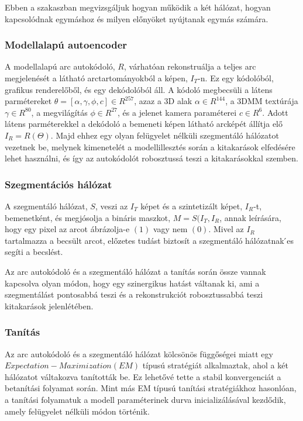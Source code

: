 \documentclass[12pt,a4]{article}
\begin{document}
 	Ebben a szakaszban megvizsgáljuk hogyan működik a két hálózat,
 	hogyan kapcsolódnak egymáshoz és milyen előnyöket nyújtanak
 	egymás számára.
 	
 	\subsubsection{Modellalapú autoencoder}
 	A modellalapú arc autokódoló, $R$, várhatóan rekonstruálja a teljes arc
 	megjelenését a látható arctartományokból a képen, $I_{T}$-n. Ez egy kódolóból, grafikus renderelőből, és egy dekódolóból áll. A kódoló megbecsüli a látens
 	parmétereket $\theta = [\alpha, \gamma, \phi, c] \in R^{257}$, azaz a 3D alak $\alpha \in R^{144}$, a 3DMM
 	textúrája $\gamma ∈ R^{80}$, a megvilágítás $\phi ∈ R^{27}$, és a jelenet kamera paraméterei
 	$c ∈ R^{6}$. Adott látens parméterekkel a dekódoló a bemeneti képen látható
 	arcképét állítja elő $I_{R} = R(\Theta)$. Majd ehhez egy olyan felügyelet nélküli szegmentáló hálózatot vezetnek be, melynek kimenetelét a modellillesztés során
 	a kitakarások elfedésére lehet használni, és így az autokódolót robosztussá
 	teszi a kitakarásokkal szemben.
 	
 	\subsubsection{Szegmentációs hálózat}
 	A szegmentáló hálózat, $S$, veszi az $I_{T}$ képet és a szintetizált képet, $I_{R}$-t, bemenetként, és megjósolja a bináris maszkot, $M = S(I_{T} , I_{R}$, annak
 	leírására, hogy egy pixel az arcot ábrázolja-e $(1)$ vagy nem $(0)$. Mivel az $I_R$ tartalmazza a becsült arcot, előzetes tudást biztosít a szegmentáló hálózatnak
 	́es segíti a becslést.
 	
 	Az arc autokódoló és a szegmentáló hálózat a tanítás során össze vannak kapcsolva olyan módon, hogy egy szinergikus hatást váltanak ki, ami a szegmentálást pontosabbá teszi és a rekonstrukciót robosztussabbá teszi kitakarások jelenlétében.
 	
 	\subsubsection{Tanítás}
 	Az arc autokódoló és a szegmentáló hálózat kölcsönös függőségei miatt egy $Expectation − Maximization(EM)$ típusú stratégiát alkalmaztak,
 	ahol a két hálózatot váltakozva tanították be. Ez lehetővé tette a stabil
 	konvergenciát a betanítási folyamat során. Mint más EM típusú tanítási
 	stratégiákhoz hasonlóan, a tanítási folyamatuk a modell paraméterinek
 	durva inicializálásával kezdődik, amely felügyelet nélküli módon történik.
 	
\end{document}
